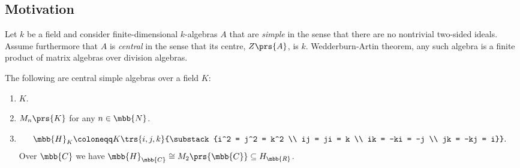\documentclass[11pt]{kbook}
\begin{document}
\subsection*{Motivation}

Let $k$ be a field and consider finite-dimensional $k$-algebras $A$ that are \emph{simple} in the sense that there are no nontrivial two-sided ideals. Assume furthermore that $A$ is \emph{central} in the sense that its centre, $Z\prs{A}$, is $k$.
Wedderburn-Artin theorem, any such algebra is a finite product of matrix algebras over division algebras.

\begin{example*}
The following are central simple algebras over a field $K$:

\begin{enumerate}
\item $K$.
\item $M_n\prs{K}$ for any $n \in \mbb{N}$.
\item \[\mbb{H}_K \coloneqq K\trs{i,j,k}{\substack{i^2 = j^2 = k^2 \\ ij = ji = k \\ ik = -ki = -j \\ jk = -kj = i}} \text{.}\]
Over $\mbb{C}$ we have $\mbb{H}_{\mbb{C}} \cong M_2\prs{\mbb{C}} \subseteq H_{\mbb{R}}$.
\end{enumerate}
\end{example*}



\printbibliography
\end{document}
